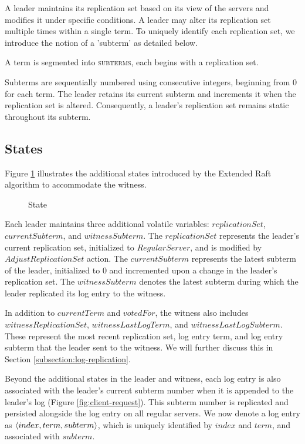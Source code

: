A leader maintains its replication set based on its view of the servers and modifies it under specific conditions. A leader may alter its replication set multiple times within a single term. To uniquely identify each replication set, we introduce the notion of a 'subterm' as detailed below.

\begin{definition} 
    A term is segmented into \textsc{subterms}, each begins with a replication set. 
\end{definition}

Subterms are sequentially numbered using consecutive integers, beginning from $0$ for each term. The leader retains its current subterm and increments it when the replication set is altered. Consequently, a leader's replication set remains static throughout its subterm.


\subsection{States}\label{subsection:states}

Figure \ref{fig:algo-state} illustrates the additional states introduced by the Extended Raft algorithm to accommodate the witness.
\begin{figure}[htbp]
    \begin{framed}
        
    \end{framed}
    \caption{State}
    \label{fig:algo-state}
\end{figure}

Each leader maintains three additional volatile variables: $replicationSet$, $currentSubterm$, and $witnessSubterm$. The $replicationSet$ represents the leader's current replication set, initialized to $RegularServer$, and is modified by $AdjustReplicationSet$ action. The $currentSubterm$ represents the latest subterm of the leader, initialized to $0$ and incremented upon a change in the leader's replication set. The $witnessSubterm$ denotes the latest subterm during which the leader replicated its log entry to the witness.

In addition to $currentTerm$ and $votedFor$, the witness also includes $witnessReplicationSet$, $witnessLastLogTerm$, and $witnessLastLogSubterm$. These represent the most recent replication set, log entry term, and log entry subterm that the leader sent to the witness. We will further discuss this in Section \ref{subsection:log-replication}.

Beyond the additional states in the leader and witness, each log entry is also associated with the leader's current subterm number when it is appended to the leader's log (Figure \ref{fig:client-request}). This subterm number is replicated and persisted alongside the log entry on all regular servers. We now denote a log entry as $\langle index,term,subterm \rangle$, which is uniquely identified by $index$ and $term$, and associated with $subterm$.

